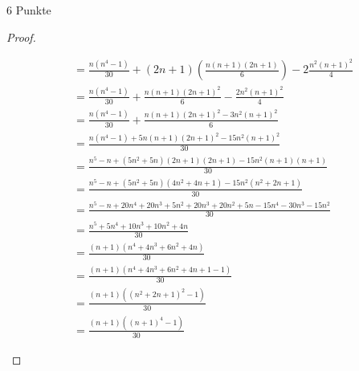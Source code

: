 \documentclass{problemset}
\begin{document}
\begin{problem}[Summenformeln]{6 Punkte}
\begin{proof}
\begin{enumerate}
\begin{align}
                                                    & = \frac{n(n^4 - 1)}{30} + (2n+1)\left(\frac{n(n+1)(2n+1)}{6}\right) - 2\frac{n^2(n+1)^2}{4}               \\
                                                    & = \frac{n(n^4 - 1)}{30} + \frac{n(n+1)(2n+1)^2}{6} - \frac{2n^2(n+1)^2}{4}                                \\
                                                    & = \frac{n(n^4 - 1)}{30} + \frac{n(n+1)(2n+1)^2 - 3n^2(n+1)^2}{6}                                          \\
                                                    & = \frac{n(n^4 - 1) + 5n(n+1)(2n+1)^2 - 15n^2(n+1)^2}{30}                                                  \\
                                                    & = \frac{n^5 - n + (5n^2+5n)(2n+1)(2n+1) - 15n^2(n+1)(n+1)}{30}                                            \\
                                                    & = \frac{n^5 - n + (5n^2+5n)(4n^2 + 4n +1) - 15n^2(n^2 + 2n +1)}{30}                                       \\
                                                    & = \frac{n^5 - n + 20n^4 + 20n^3 + 5n^2 + 20n^3 + 20n^2 + 5n - 15n^4- 30n^3 - 15n^2}{30}                   \\
                                                    & = \frac{n^5 + 5n^4 + 10n^3 + 10n^2 + 4n}{30}                                                              \\
                                                    & = \frac{(n+1)(n^4+4n^3+6n^2+4n)}{30} \tag{Polynomdivision}                                                \\
                                                    & = \frac{(n+1)(n^4+4n^3+6n^2+4n + 1 - 1)}{30}                                                              \\
                                                    & = \frac{(n+1)((n^2 + 2n +1)^2 - 1)}{30}                                                                   \\
                                                    & = \frac{(n+1)((n + 1)^4 - 1)}{30}
              \end{align}
    \end{enumerate}
\end{proof}
\end{problem}
\end{document}
